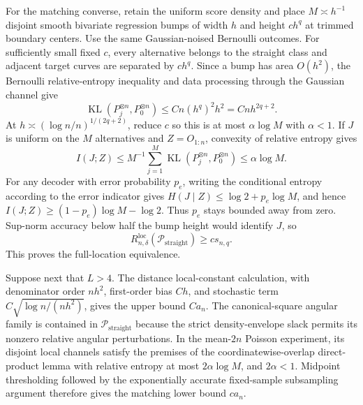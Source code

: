 For the matching converse, retain the uniform score density and place \(M\asymp h^{-1}\) disjoint smooth bivariate regression bumps of width \(h\) and height \(c h^q\) at trimmed boundary centers.  Use the same Gaussian-noised Bernoulli outcomes.  For sufficiently small fixed \(c\), every alternative belongs to the straight class and adjacent target curves are separated by \(c h^q\).  Since a bump has area \(O(h^2)\), the Bernoulli relative-entropy inequality and data processing through the Gaussian channel give
\[
 \operatorname{KL}(P_j^{\otimes n},P_0^{\otimes n})
 \leq Cn(h^q)^2h^2=Cnh^{2q+2}.
\]
At \(h\asymp(\log n/n)^{1/(2q+2)}\), reduce \(c\) so this is at most \(\alpha\log M\) with \(\alpha<1\).  If \(J\) is uniform on the \(M\) alternatives and \(Z=O_{1:n}\), convexity of relative entropy gives
\[
 I(J;Z)\leq M^{-1}\sum_{j=1}^M
 \operatorname{KL}(P_j^{\otimes n},P_0^{\otimes n})
 \leq\alpha\log M.
\]
For any decoder with error probability \(p_e\), writing the conditional entropy according to the error indicator gives
\(H(J\mid Z)\leq\log2+p_e\log M\), and hence
\(I(J;Z)\geq(1-p_e)\log M-\log2\).  Thus \(p_e\) stays bounded away from zero.  Sup-norm accuracy below half the bump height would identify \(J\), so
\[
 R_{n,\delta}^{\mathrm{loc}}(\mathcal P_{\mathrm{straight}})
 \geq c s_{n,q}.
\]
This proves the full-location equivalence.

Suppose next that \(L>4\).  The distance local-constant calculation, with denominator order \(nh^2\), first-order bias \(Ch\), and stochastic term \(C\sqrt{\log n/(nh^2)}\), gives the upper bound \(Ca_n\).  The canonical-square angular family is contained in \(\mathcal P_{\mathrm{straight}}\) because the strict density-envelope slack permits its nonzero relative angular perturbations.  In the mean-\(2n\) Poisson experiment, its disjoint local channels satisfy the premises of the coordinatewise-overlap direct-product lemma with relative entropy at most \(2\alpha\log M\), and \(2\alpha<1\).  Midpoint thresholding followed by the exponentially accurate fixed-sample subsampling argument therefore gives the matching lower bound \(ca_n\).

